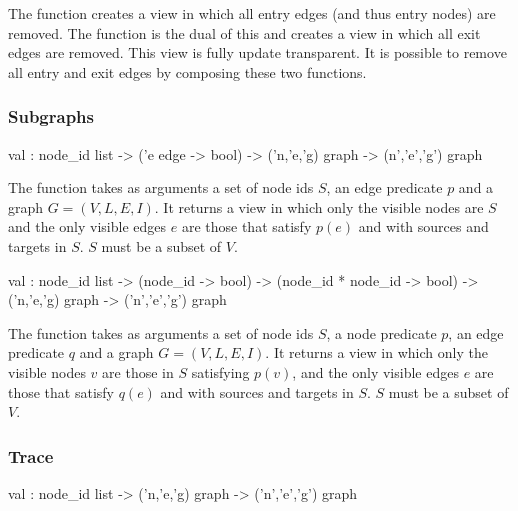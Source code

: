 The function  creates a view in which
all entry edges (and thus entry nodes) are removed.   The function
 is the dual of this and creates a view in which
all exit edges are removed.  This view is fully update transparent.
It is possible to remove all entry and exit edges by composing these
two functions.

\subsubsection{Subgraphs} 
\begin{SML}
   val  : node_id list -> ('e edge -> bool) -> 
     ('n,'e,'g) graph -> (n','e','g') graph
\end{SML}

   The function  takes as arguments a set of node ids
$S$, an edge predicate $p$ and a graph $G=(V,L,E,I)$.  It
returns a view in which only the visible nodes are $S$ and
the only visible edges $e$ are those that satisfy $p(e)$ and
with sources and targets in $S$.  $S$ must be a subset of $V$.

\begin{SML}
   val  : node_id list -> 
     (node_id -> bool) -> (node_id * node_id -> bool) ->
     ('n,'e,'g) graph -> ('n','e','g') graph
\end{SML}

   The function  takes as arguments a set of node ids
$S$, a node predicate $p$, an edge predicate $q$ and a graph $G=(V,L,E,I)$.  It
returns a view in which only the visible nodes $v$ are those 
in $S$ satisfying $p(v)$, and
the only visible edges $e$ are those that satisfy $q(e)$ and
with sources and targets in $S$.  $S$ must be a subset of $V$.

\subsubsection{Trace}
\begin{SML}
   val  : node_id list -> ('n,'e,'g) graph -> ('n','e','g') graph
\end{SML}

